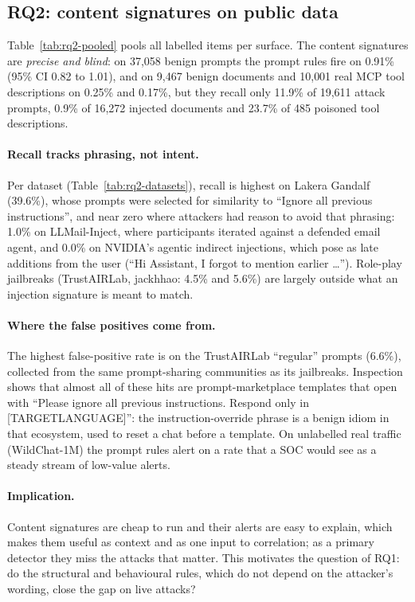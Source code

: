 \subsection{RQ2: content signatures on public data}
\label{sec:rq2}

Table~\ref{tab:rq2-pooled} pools all labelled items per surface. The content signatures are
\emph{precise and blind}: on 37{,}058 benign prompts the prompt rules fire on 0.91\% (95\% CI 0.82 to
1.01), and on 9{,}467 benign documents and 10{,}001 real MCP tool descriptions on 0.25\% and 0.17\%,
but they recall only 11.9\% of 19{,}611 attack prompts, 0.9\% of 16{,}272 injected documents and
23.7\% of 485 poisoned tool descriptions.

\begin{table}[t]\centering\small
\resizebox{\textwidth}{!}{}
\caption{Content signatures pooled over all labelled public datasets, per surface.}
\label{tab:rq2-pooled}
\end{table}

\paragraph{Recall tracks phrasing, not intent.} Per dataset (Table~\ref{tab:rq2-datasets}), recall is
highest on Lakera Gandalf (39.6\%), whose prompts were selected for similarity to ``Ignore all
previous instructions'', and near zero where attackers had reason to avoid that phrasing: 1.0\% on
LLMail-Inject, where participants iterated against a defended email agent, and 0.0\% on NVIDIA's agentic
indirect injections, which pose as late additions from the user (``Hi Assistant, I forgot to mention
earlier \ldots''). Role-play jailbreaks (TrustAIRLab, jackhhao: 4.5\% and 5.6\%) are largely outside
what an injection signature is meant to match.

\paragraph{Where the false positives come from.} The highest false-positive rate is on the
TrustAIRLab ``regular'' prompts (6.6\%), collected from the same prompt-sharing communities as its
jailbreaks. Inspection shows that almost all of these hits are prompt-marketplace templates that open
with ``Please ignore all previous instructions. Respond only in [TARGETLANGUAGE]'': the
instruction-override phrase is a benign idiom in that ecosystem, used to reset a chat before a
template. On unlabelled real traffic (WildChat-1M) the prompt rules alert on
a rate that a SOC would see as a steady stream of low-value alerts.

\paragraph{Implication.} Content signatures are cheap to run and their alerts are easy to explain,
which makes them useful as context and as one input to correlation; as a primary detector they
miss the attacks that matter. This motivates the question of RQ1: do the structural and behavioural
rules, which do not depend on the attacker's wording, close the gap on live attacks?
